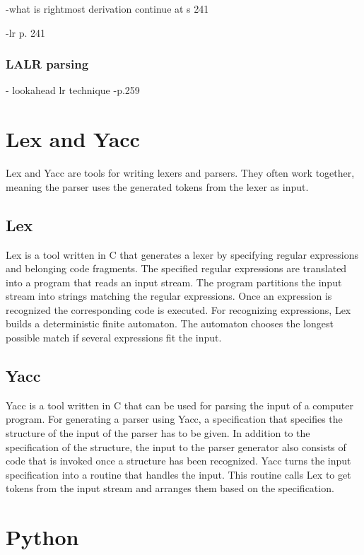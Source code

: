 -what is rightmost derivation
continue at s 241


\cite{Aho.2007}
-lr p. 241

\subsubsection{LALR parsing}\label{sec:BackgroundParserLALR}

- lookahead lr technique
\cite{Aho.2007}
-p.259

\section{Lex and Yacc}\label{sec:BackgroundLexYacc}

Lex and Yacc are tools for writing lexers and parsers. They often work together, meaning the parser uses the generated tokens from the lexer as input.

\subsection{Lex}\label{sec:BackgroundLex}

Lex is a tool written in C that generates a lexer by specifying regular expressions and belonging code fragments. The specified regular expressions are translated into a program that reads an input stream. The program partitions the input stream into strings matching the regular expressions. Once an expression is recognized the corresponding code is executed. For recognizing expressions, Lex builds a deterministic finite automaton. The automaton chooses the longest possible match if several expressions fit the input. \cite{Lex}

\subsection{Yacc}\label{sec:BackgroundYacc}
Yacc is a tool written in C that can be used for parsing the input of a computer program. 
For generating a parser using Yacc, a specification that specifies the structure of the input of the parser has to be given. In addition to the specification of the structure, the input to the parser generator also consists of code that is invoked once a structure has been recognized. 
Yacc turns the input specification into a routine that handles the input. This routine calls Lex to get tokens from the input stream and arranges them based on the specification. \cite{Yacc}

\section{Python}\label{sec:BackgroundPython}

